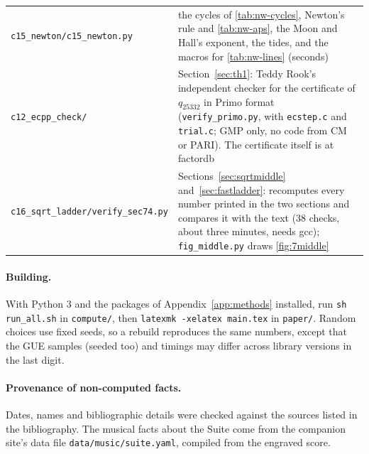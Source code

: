 {\begin{longtable}{@{}>{\raggedright\arraybackslash}p{}>{\raggedright\arraybackslash}p{}@{}}
\texttt{c15\_newton/c15\_newton.py} \addedon{\revF} & the cycles of \cref{tab:nw-cycles}, Newton's rule and \cref{tab:nw-aps}, the Moon and Hall's exponent, the tides, and the macros for \cref{tab:nw-lines} (seconds) \\
\texttt{c12\_ecpp\_check/} \addedon{\revG} & Section~\ref{sec:th1}: Teddy Rook's independent checker for the certificate of $q_{25332}$ in Primo format (\texttt{verify\_primo.py}, with \texttt{ecstep.c} and \texttt{trial.c}; GMP only, no code from CM or PARI). The certificate itself is at factordb \citep{FactorDBq25332} \\
\texttt{c16\_sqrt\_ladder/verify\_sec74.py} \addedon{\revG} & Sections~\ref{sec:sqrtmiddle} and~\ref{sec:fastladder}: recomputes every number printed in the two sections and compares it with the text (38 checks, about three minutes, needs gcc); \texttt{fig\_middle.py} draws \cref{fig:7middle} \\
\end{longtable}}

\paragraph{Building.} With Python 3 and the packages of Appendix~\ref{app:methods} installed, run \texttt{sh run\_all.sh} in \texttt{compute/}, then \texttt{latexmk -xelatex main.tex} in \texttt{paper/}. Random choices use fixed seeds, so a rebuild reproduces the same numbers, except that the GUE samples (seeded too) and timings may differ across library versions in the last digit.

\paragraph{Provenance of non-computed facts.} Dates, names and bibliographic details were checked against the sources listed in the bibliography. The musical facts about the Suite come from the companion site's data file \texttt{data/music/suite.yaml}, compiled from the engraved score.
